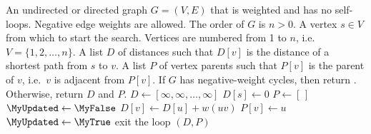 
\begin{algorithmic}[1]
\Require An undirected or directed graph $G = (V, E)$ that is weighted
  and has no self-loops. Negative edge weights are allowed. The order
  of $G$ is $n > 0$. A vertex $s \in V$ from which to start the
  search. Vertices are numbered from 1 to $n$,
  i.e.~$V = \{1, 2, \dots, n\}$.
\Ensure A list $D$ of distances such that $D[v]$ is the distance of a
  shortest path from $s$ to $v$. A list $P$ of vertex parents such
  that $P[v]$ is the parent of $v$, i.e.~$v$ is adjacent from
  $P[v]$. If $G$ has negative-weight cycles, then return
  \MyFalse. Otherwise, return $D$ and $P$.
\State $D \gets [\infty, \infty, \dots, \infty]$
\State $D[s] \gets 0$
\State $P \gets [\,]$
  \State $\MyUpdated \gets \MyFalse$
      \State $D[v] \gets D[u] + w(uv)$
      \State $P[v] \gets u$
      \State $\MyUpdated \gets \MyTrue$
    \EndIf
  \EndFor
  \If{$\MyUpdated = \MyFalse$}
    \State exit the loop
  \EndIf
\EndFor
{}
    \State \Return \MyFalse
  \EndIf
\EndFor
\State \Return $(D, P)$
\end{algorithmic}
